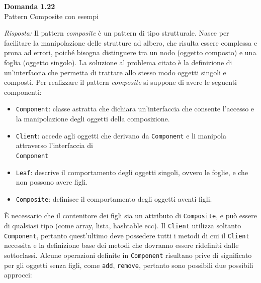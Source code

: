 \documentclass{article}
\newenvironment{problem}[2][Domanda]
    { \begin{mdframed}[backgroundcolor=gray!20] \textbf{#1 #2} \\}
    {  \end{mdframed}}
\newenvironment{solution}
    {\textit{Risposta:}}
    {}
\begin{document}
\begin{problem}{1.22}
Pattern Composite con esempi
\end{problem}
\begin{solution}
Il pattern \textit{composite} è un pattern di tipo strutturale.\newline
Nasce per facilitare la manipolazione delle strutture ad albero, che risulta essere complessa e prona ad errori, poiché bisogna distinguere tra un nodo (oggetto composto) e una foglia (oggetto singolo).
La soluzione al problema citato è la definizione di un'interfaccia che permetta di trattare allo stesso modo oggetti singoli e composti.
Per realizzare il pattern \textit{composite} si suppone di avere le seguenti componenti:
\begin{itemize}
	\item \texttt{Component}: classe astratta che dichiara un'interfaccia che consente l'accesso e la manipolazione degli oggetti della composizione.
	\item \texttt{Client}: accede agli oggetti che derivano da \texttt{Component} e li manipola attraverso l'interfaccia di
	\\\texttt{Component}
	\item \texttt{Leaf}: descrive il comportamento degli oggetti singoli, ovvero le foglie, e che non possono avere figli.
	\item \texttt{Composite}: definisce il comportamento degli oggetti aventi figli.
\end{itemize}
È necessario che il contenitore dei figli sia un attributo di \texttt{Composite}, e può essere di qualsiasi tipo (come array, lista,
hashtable ecc).
Il \texttt{Client} utilizza soltanto \texttt{Component}, pertanto quest'ultimo deve possedere tutti i metodi di cui il \texttt{Client} necessita e la definizione base dei metodi che dovranno essere ridefiniti dalle sottoclassi.
Alcune operazioni definite in \texttt{Component} risultano prive di significato per gli oggetti senza figli, come \texttt{add}, \texttt{remove}, pertanto sono possibili due possibili approcci:


\end{solution}
\end{document}
